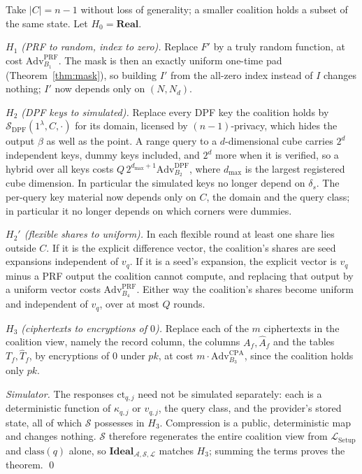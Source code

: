 \documentclass[a4paper,fleqn]{cas-sc}
\newcommand{\Real}{\mathbf{Real}}
\newcommand{\Ideal}{\mathbf{Ideal}}
\newcommand{\Leak}{\mathcal{L}}
\newcommand{\Sim}{\mathcal{S}}
\newcommand{\Adv}{\mathcal{A}}
\begin{document}
\begin{pf}
Take $|C|=n-1$ without loss of generality; a smaller coalition holds a subset
of the same state. Let $H_0=\Real$.

\emph{$H_1$ (PRF to random, index to zero).} Replace $F'$ by a truly random
function, at cost $\mathrm{Adv}^{\mathrm{PRF}}_{B_1}$. The mask is then an
exactly uniform one-time pad (Theorem~\ref{thm:mask}), so building $I'$ from
the all-zero index instead of $I$ changes nothing; $I'$ now depends only on
$(N,N_d)$.

\emph{$H_2$ (DPF keys to simulated).} Replace every DPF key the coalition
holds by $\Sim_{\mathrm{DPF}}(1^\lambda,C,\cdot)$ for its domain, licensed by
$(n{-}1)$-privacy, which hides the output $\beta$ as well as the point. A range
query to a $d$-dimensional cube carries $2^d$ independent keys, dummy keys
included, and $2^d$ more when it is verified, so a hybrid over all keys costs
$Q\,2^{d_{\max}+1}\mathrm{Adv}^{\mathrm{DPF}}_{B_2}$, where $d_{\max}$ is the
largest registered cube dimension. In particular the simulated keys no longer
depend on $\delta_s$. The per-query key material now depends only
on $C$, the domain and the query class; in particular it no longer depends on
which corners were dummies.

\emph{$H_2'$ (flexible shares to uniform).} In each flexible round at least one
share lies outside $C$. If it is the explicit difference vector, the
coalition's shares are seed expansions independent of $v_q$. If it is a seed's
expansion, the explicit vector is $v_q$ minus a PRF output the coalition cannot
compute, and replacing that output by a uniform vector costs
$\mathrm{Adv}^{\mathrm{PRF}}_{B_4}$. Either way the coalition's shares become
uniform and independent of $v_q$, over at most $Q$ rounds.

\emph{$H_3$ (ciphertexts to encryptions of $0$).} Replace each of the $m$
ciphertexts in the coalition view, namely the record column, the columns
$A_f,\widehat A_f$ and the tables $T_f,\widehat T_f$, by encryptions of $0$
under $pk$,
at cost $m\cdot\mathrm{Adv}^{\mathrm{CPA}}_{B_3}$, since the coalition holds
only $pk$.

\emph{Simulator.} The responses $\text{ct}_{q,j}$ need not be simulated
separately: each is a deterministic function of $\kappa_{q,j}$ or $v_{q,j}$,
the query class, and the provider's stored state, all of which $\Sim$
possesses in $H_3$. Compression is a public, deterministic map and changes
nothing. $\Sim$ therefore regenerates the entire coalition view from
$\Leak_{\mathrm{Setup}}$ and $\mathrm{class}(q)$ alone, so
$\Ideal_{\Adv,\Sim,\Leak}$ matches $H_3$; summing the terms proves the
theorem. \qed
\end{pf}
\end{document}
